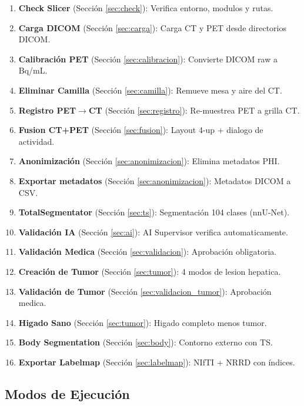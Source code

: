 \documentclass[12pt,a4paper]{article}
\begin{document}
\begin{enumerate}
    \item \textbf{Check Slicer} (Sección \ref{sec:check}): Verifica entorno, modulos y rutas.
    \item \textbf{Carga DICOM} (Sección \ref{sec:carga}): Carga CT y PET desde directorios DICOM.
    \item \textbf{Calibración PET} (Sección \ref{sec:calibracion}): Convierte DICOM raw a Bq/mL.
    \item \textbf{Eliminar Camilla} (Sección \ref{sec:camilla}): Remueve mesa y aire del CT.
    \item \textbf{Registro PET$\to$CT} (Sección \ref{sec:registro}): Re-muestrea PET a grilla CT.
    \item \textbf{Fusion CT+PET} (Sección \ref{sec:fusion}): Layout 4-up + dialogo de actividad.
    \item \textbf{Anonimización} (Sección \ref{sec:anonimizacion}): Elimina metadatos PHI.
    \item \textbf{Exportar metadatos} (Sección \ref{sec:anonimizacion}): Metadatos DICOM a CSV.
    \item \textbf{TotalSegmentator} (Sección \ref{sec:ts}): Segmentación 104 clases (nnU-Net).
    \item \textbf{Validación IA} (Sección \ref{sec:ai}): AI Supervisor verifica automaticamente.
    \item \textbf{Validación Medica} (Sección \ref{sec:validacion}): Aprobación obligatoria.
    \item \textbf{Creación de Tumor} (Sección \ref{sec:tumor}): 4 modos de lesion hepatica.
    \item \textbf{Validación de Tumor} (Sección \ref{sec:validacion_tumor}): Aprobación medica.
    \item \textbf{Higado Sano} (Sección \ref{sec:tumor}): Higado completo menos tumor.
    \item \textbf{Body Segmentation} (Sección \ref{sec:body}): Contorno externo con TS.
    \item \textbf{Exportar Labelmap} (Sección \ref{sec:labelmap}): NIfTI + NRRD con índices.
\end{enumerate}

\subsection{Modos de Ejecución}
\end{document}
